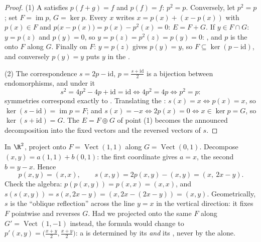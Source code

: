 \begin{proof}
(1) A  satisfies $p(f + g) = f$ and $p(f) = f$: $p^2 = p$.
Conversely, let $p^2 = p$; set $F = \operatorname{im} p$, $G = \ker
p$. Every $x$ writes $x = p(x) + (x - p(x))$ with $p(x) \in F$ and
$p\bigl(x - p(x)\bigr) = p(x) - p^2(x) = 0$: $E = F + G$. If $y \in
F \cap G$: $y = p(z)$ and $p(y) = 0$, so $y = p(z) = p^2(z) = p(y) =
0$: , and $p$ is the  onto $F$ along $G$.
Finally on $F$: $y = p(z)$ gives $p(y) = y$, so $F \subseteq
\ker(p - \mathrm{id})$, and conversely $p(y) = y$ puts $y$ in the
.

(2) The correspondence $s = 2p - \mathrm{id}$, $p = \frac{s +
\mathrm{id}}2$ is a bijection between endomorphisms, and under it
\[
s^2 = 4p^2 - 4p + \mathrm{id} = \mathrm{id}
\iff 4p^2 = 4p \iff p^2 = p :
\]
symmetries correspond exactly to . Translating the
: $s(x) = x \iff p(x) = x$, so $\ker(s - \mathrm{id}) =
\operatorname{im} p = F$; and $s(x) = -x \iff 2p(x) = 0 \iff x
\in \ker p = G$, so $\ker(s + \mathrm{id}) = G$. The 
$E = F \oplus G$ of point (1) becomes the announced decomposition
into the fixed vectors and the reversed vectors of $s$.
\end{proof}

\begin{example}
\label{ex:b1:linmaps:projexplicit}
In $\R^2$, project onto $F = \operatorname{Vect}(1,1)$ along $G =
\operatorname{Vect}(0,1)$. Decompose $(x, y) = a(1,1) + b(0,1)$:
the first coordinate gives $a = x$, the second $b = y - x$.
Hence
\[
p(x, y) = (x, x),
\qquad
s(x, y) = 2p(x,y) - (x,y) = (x,\ 2x - y).
\]
Check the algebra: $p(p(x,y)) = p(x,x) = (x,x)$, and $s(s(x,y)) =
s(x, 2x - y) = (x, 2x - (2x - y)) = (x, y)$. Geometrically, $s$
is the ``oblique reflection'' across the line $y = x$ in the
vertical direction: it fixes $F$ pointwise and reverses $G$. Had
we projected onto the same $F$ along $G' =
\operatorname{Vect}(1,-1)$ instead, the formula would change to
$p'(x,y) = \bigl(\frac{x+y}2, \frac{x+y}2\bigr)$: a  is
determined by its  \emph{and} its , never by the 
alone.
\end{example}

